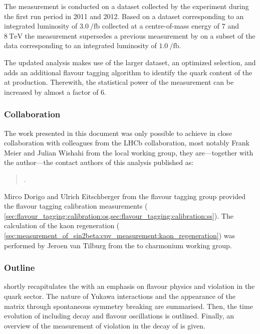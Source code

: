 The measurement is conducted on a dataset collected by the \LHCb experiment during
the first \LHC run period in 2011 and 2012. Based on a dataset corresponding to
an integrated luminosity of $\SI{3.0}{\per\femto\barn}$ collected at a
centre-of-mass energy of $\num{7}$ and $\SI{8}{\TeV}$ the measurement supersedes
a previous measurement by \LHCb \cite{Aaij:1497268} on a subset of the data
corresponding to an integrated luminosity of $\SI{1.0}{\per\femto\barn}$.

The updated analysis makes use of the larger dataset, an optimized selection,
and adds an additional flavour tagging algorithm to identify the quark content
of the \Bmeson at production. Therewith, the statistical power of the
measurement can be increased by almost a factor of $\num{6}$.

\subsubsection*{Collaboration}
The work presented in this document was only possible to achieve in close
collaboration with colleagues from the \acs{LHCb} collaboration, most notably
Frank Meier and Julian Wishahi from the local working group, they are---together
with the author---the contact authors of this analysis published as:
%
\begin{quotation}
  .
\end{quotation}

Mirco Dorigo and Ulrich Eitschberger from the flavour tagging group provided the
flavour tagging calibration measurements (\cf
\cref{sec:flavour_tagging:calibration:os,sec:flavour_tagging:calibration:ss}).
The calculation of the kaon regeneration (\cf
\cref{sec:measurement_of_sin2beta:cpv_measurement:kaon_regeneration}) was
performed by Jeroen van Tilburg from the \B to charmonium working group.

\subsubsection*{Outline}

 shortly recapitulates the \SM with an emphasis on flavour
physics and \CP violation in the quark sector. The nature of Yukawa interactions
and the appearance of the \CKM matrix through spontaneous symmetry breaking are
summarised. Then, the time evolution of \Bmesons including decay and flavour
oscillations is outlined. Finally, an overview of the measurement of
\CP violation in the decay of \BdToJpsiKS is given.

